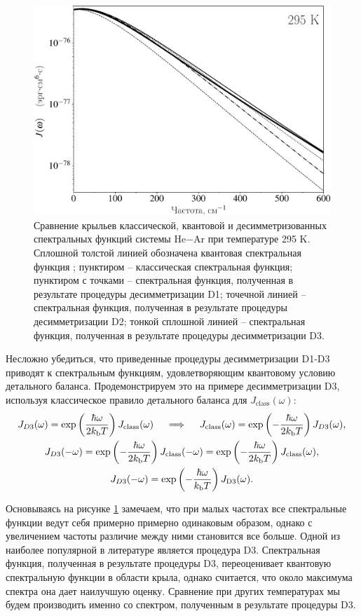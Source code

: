 \begin{figure}
    \centering
    \includegraphics[width=0.7\linewidth]{./pictures/two_atom_spectra/spectral_function_desymmetrizations-crop.pdf}
    \caption{Сравнение крыльев классической, квантовой и десимметризованных спектральных функций системы He$-$Ar при температуре 295 K. Сплошной толстой линией обозначена квантовая спектральная функция \cite{buryak2014}; пунктиром -- классическая спектральная функция; пунктиром с точками -- спектральная функция, полученная в результате процедуры десимметризации D1; точечной линией -- спектральная функция, полученная в результате процедуры десимметризации D2; тонкой сплошной линией -- спектральная функция, полученная в результате процедуры десимметризации D3.}
    \label{fig:desymmetrisation-spectral-functions}
\end{figure}

Несложно убедиться, что приведенные процедуры десимметризации D1-D3 приводят к спектральным функциям, удовлетворяющим квантовому условию детального баланса. Продемонстрируем это на примере десимметризации D3, используя классическое правило детального баланса для $J_\text{class}(\omega)$:
\begin{gather}
    J_{D3}(\omega) = \exp \left( \frac{\hbar \omega}{2 k_\text{b} T} \right) J_\text{class}(\omega) \quad \implies \quad J_\text{class}(\omega) = \exp \left( -\frac{\hbar \omega}{2 k_\text{b} T} \right) J_{D3}(\omega), \label{d1} \\
    J_{D3}(-\omega) = \exp \left( -\frac{\hbar \omega}{2 k_\text{b} T} \right) J_\text{class}(-\omega) = \exp \left( -\frac{\hbar \omega}{2 k_\text{b} T} \right) J_\text{class}(\omega), \label{d2} \\
    J_{D3}(-\omega) = \exp \left( -\frac{\hbar \omega}{k_\text{b} T} \right) J_\text{D3}(\omega). \label{d3}
\end{gather}

Основываясь на рисунке \ref{fig:desymmetrisation-spectral-functions} замечаем, что при малых частотах все спектральные функции ведут себя примерно примерно одинаковым образом, однако с увеличением частоты различие между ними становится все больше. Одной из наиболее популярной в литературе является процедура D3. Спектральная функция, полученная в результате процедуры D3, переоценивает квантовую спектральную функции в области крыла, однако считается, что около максимума спектра она дает наилучшую оценку. Сравнение при других температурах мы будем производить именно со спектром, полученным в результате процедуры D3. \par

